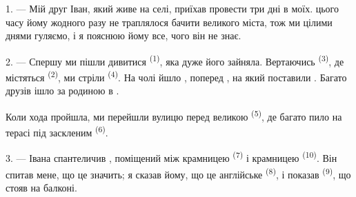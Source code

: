 %
%

\VUsaut{4.0mm}
\VUsaut{3.0mm}

\VUsaut{3.0mm}

1. --- Мій друг Іван, який живе на селі, приїхав провести три дні в моїх.
 цього часу йому жодного разу не траплялося бачити великого міста,
тож ми цілими днями гуляємо, і я пояснюю йому все, чого він не знає.

2. --- Спершу ми пішли дивитися  \textsuperscript{(1)}, яка
дуже його зайняла. Вертаючись  \textsuperscript{(3)}, де
містяться  \textsuperscript{(2)}, ми стріли
 \textsuperscript{(4)}. На чолі  йшло
, поперед , на який поставили
. Багато друзів ішло за родиною в .

Коли хода пройшла, ми перейшли вулицю перед великою 
\textsuperscript{(5)}, де багато  пило  на
терасі під заскленим  \textsuperscript{(6)}.

3. --- Івана спантеличив , поміщений між крамницею
 \textsuperscript{(7)} і крамницею
 \textsuperscript{(10)}. Він спитав мене, що це значить; я
сказав йому, що це англійське  \textsuperscript{(8)}, і
показав  \textsuperscript{(9)}, що стояв на балконі.

